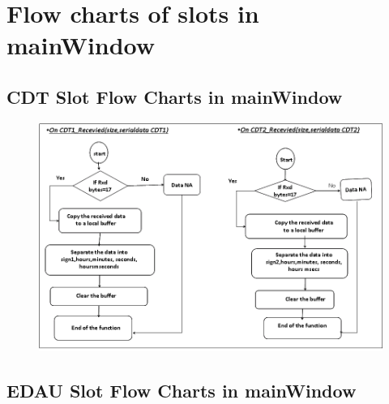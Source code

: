 \section{Flow charts of slots in mainWindow}
\subsection{CDT Slot Flow Charts in mainWindow}

\begin{figure}[H]
	\centering
	\includegraphics[width=\linewidth]{./FlowCharts/PngFlowCharts/SLOT_CDT12.png}
\end{figure}
\subsection{EDAU Slot Flow Charts in mainWindow}

